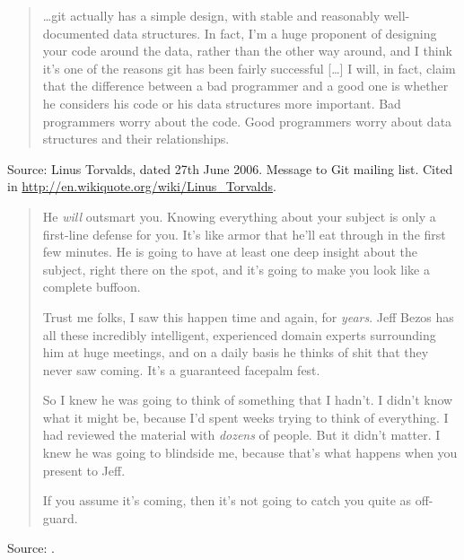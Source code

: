 \documentclass[a4paper]{article}
\begin{document}
\begin{quote}
\ldots git actually has a simple design, with stable and reasonably well-documented data structures.
In fact, I'm a huge proponent of designing your code around the data, rather than the other way
around, and I think it's one of the reasons git has been fairly successful [\ldots] I will, in fact,
claim that the difference between a bad programmer and a good one is whether he considers his code
or his data structures more important.  Bad programmers worry about the code.  Good programmers
worry about data structures and their relationships.
\end{quote}
Source: Linus Torvalds, dated 27th June 2006.  Message to Git mailing list.
Cited in \url{http://en.wikiquote.org/wiki/Linus_Torvalds}.
\medskip

\begin{quotation}
He \emph{will} outsmart you. Knowing everything about your subject is only a first-line defense for
you.  It's like armor that he'll eat through in the first few minutes.  He is going to have at least
one deep insight about the subject, right there on the spot, and it's going to make you look like a
complete buffoon.

Trust me folks, I saw this happen time and again, for \emph{years}.  Jeff Bezos has all these
incredibly intelligent, experienced domain experts surrounding him at huge meetings, and on a daily
basis he thinks of shit that they never saw coming.  It's a guaranteed facepalm fest.

So I knew he was going to think of something that I hadn't.  I didn't know what it might be, because
I'd spent weeks trying to think of everything.  I had reviewed the material with \emph{dozens} of
people.  But it didn't matter.  I knew he was going to blindside me, because that's what happens
when you present to Jeff.

If you assume it's coming, then it's not going to catch you quite as off-guard.
\end{quotation}
Source: \citet{Yegge2011b}.
\medskip
\end{document}
